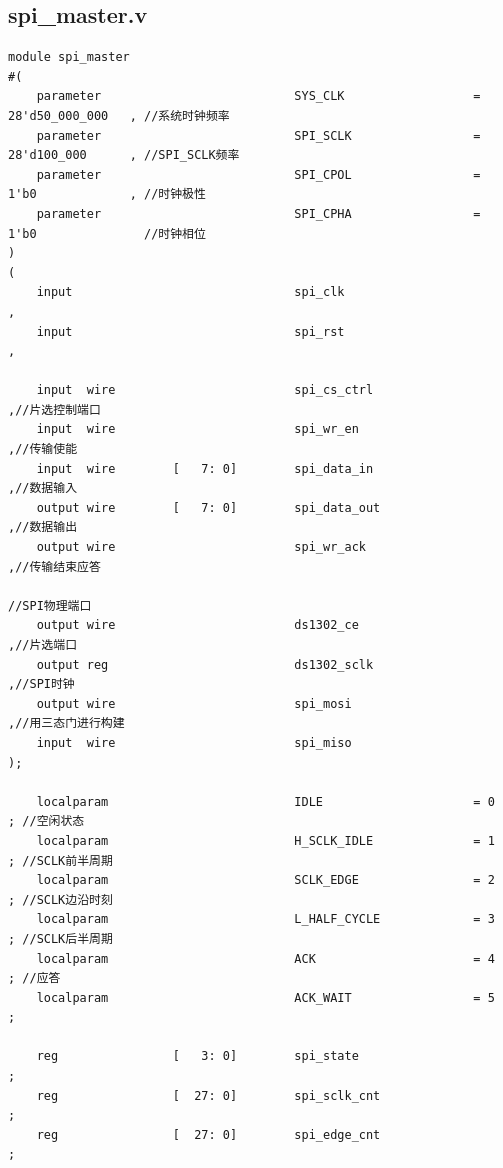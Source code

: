 \documentclass[a4paper,10pt]{article}
\begin{document}
\subsection{spi_master.v}
\begin{lstlisting}[caption=spi_master.v]
module spi_master
#(
    parameter                           SYS_CLK                  = 28'd50_000_000   , //系统时钟频率
    parameter                           SPI_SCLK                 = 28'd100_000      , //SPI_SCLK频率
    parameter                           SPI_CPOL                 = 1'b0             , //时钟极性
    parameter                           SPI_CPHA                 = 1'b0               //时钟相位
)
(
    input                               spi_clk                                     ,
    input                               spi_rst                                     ,

    input  wire                         spi_cs_ctrl                                 ,//片选控制端口
    input  wire                         spi_wr_en                                   ,//传输使能
    input  wire        [   7: 0]        spi_data_in                                 ,//数据输入
    output wire        [   7: 0]        spi_data_out                                ,//数据输出
    output wire                         spi_wr_ack                                  ,//传输结束应答

//SPI物理端口
    output wire                         ds1302_ce                                    ,//片选端口
    output reg                          ds1302_sclk                                  ,//SPI时钟
    output wire                         spi_mosi                                     ,//用三态门进行构建
    input  wire                         spi_miso                  
);

    localparam                          IDLE                     = 0                 ; //空闲状态
    localparam                          H_SCLK_IDLE              = 1                 ; //SCLK前半周期
    localparam                          SCLK_EDGE                = 2                 ; //SCLK边沿时刻
    localparam                          L_HALF_CYCLE             = 3                 ; //SCLK后半周期
    localparam                          ACK                      = 4                 ; //应答
    localparam                          ACK_WAIT                 = 5                 ;     
    
    reg                [   3: 0]        spi_state                                    ;
    reg                [  27: 0]        spi_sclk_cnt                                 ;
    reg                [  27: 0]        spi_edge_cnt                                 ;


\end{lstlisting}
\end{document}
